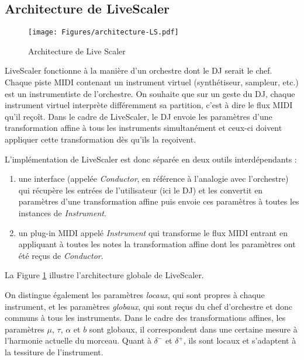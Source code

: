 \subsection{Architecture de LiveScaler}

\begin{figure}[htbp]
  \centering
	\texttt{[image: Figures/architecture-LS.pdf]}
  \caption{Architecture de Live Scaler\label{fig:archi}}
\end{figure}

LiveScaler fonctionne à la manière d'un orchestre dont le DJ serait le chef. Chaque piste MIDI contenant un instrument virtuel (synthétiseur, sampleur, etc.) est un instrumentiste de l'orchestre. On souhaite que sur un geste du DJ, chaque instrument virtuel interprète différemment sa partition, c'est à dire le flux MIDI qu'il reçoît. Dans le cadre de LiveScaler, le DJ envoie les paramètres d'une transformation affine à tous les instruments simultanément et ceux-ci doivent appliquer cette transformation dès qu'ils la reçoivent.

L'implémentation de LiveScaler est donc séparée en deux outils interdépendants : 
\begin{enumerate}
  \item une interface (appelée \emph{Conductor}, en référence à l'analogie avec l'orchestre) qui récupère les entrées de l'utilisateur (ici le DJ) et les convertit en paramètres d'une transformation affine puis envoie ces paramètres à toutes les instances de \emph{Instrument}.
  \item un plug-in MIDI appelé \emph{Instrument} qui transforme le flux MIDI entrant en appliquant à toutes les notes la transformation affine dont les paramètres ont été reçus de \emph{Conductor}.
\end{enumerate}
La Figure \ref{fig:archi} illustre l'architecture globale de LiveScaler.

On distingue également les paramètres \emph{locaux}, qui sont propres à chaque instrument, et les paramètres \emph{globaux}, qui sont reçus du chef d'orchestre et donc communs à tous les instruments. Dans le cadre des transformations affines, les paramètres $\mu$, $\tau$, $\alpha$  et $b$ sont globaux, il correspondent dans une certaine mesure à l'harmonie actuelle du morceau. Quant à $\delta^-$ et $\delta^+$, ils sont locaux et s'adaptent à la tessiture de l'instrument.

